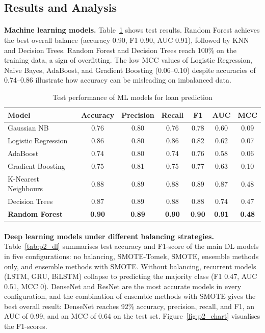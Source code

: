 \documentclass[12pt,a4paper,final]{extreport}
\begin{document}
\subsection{Results and Analysis}

\paragraph{} \textbf{Machine learning models.} Table~\ref{tab:p2_ml} shows test results. Random Forest achieves the best overall balance (accuracy 0.90, F1 0.90, AUC 0.91), followed by KNN and Decision Trees. Random Forest and Decision Trees reach 100\% on the training data, a sign of overfitting. The low MCC values of Logistic Regression, Naive Bayes, AdaBoost, and Gradient Boosting (0.06--0.10) despite accuracies of 0.74--0.86 illustrate how accuracy can be misleading on imbalanced data.

{\renewcommand{\arraystretch}{1.2}
\begin{table}[htbp]
\centering
\caption{Test performance of ML models for loan prediction \cite{p2}}\label{tab:p2_ml}
\small
\begin{tabular}{|l|c|c|c|c|c|c|}
\hline
\textbf{Model} & \textbf{Accuracy} & \textbf{Precision} & \textbf{Recall} & \textbf{F1} & \textbf{AUC} & \textbf{MCC} \\ \hline
Gaussian NB & 0.76 & 0.80 & 0.76 & 0.78 & 0.60 & 0.09 \\ \hline
Logistic Regression & 0.86 & 0.80 & 0.86 & 0.82 & 0.62 & 0.07 \\ \hline
AdaBoost & 0.74 & 0.80 & 0.74 & 0.76 & 0.58 & 0.06 \\ \hline
Gradient Boosting & 0.75 & 0.81 & 0.75 & 0.77 & 0.63 & 0.10 \\ \hline
K-Nearest Neighbours & 0.88 & 0.89 & 0.88 & 0.89 & 0.87 & 0.48 \\ \hline
Decision Trees & 0.87 & 0.89 & 0.88 & 0.88 & 0.74 & 0.47 \\ \hline
\textbf{Random Forest} & \textbf{0.90} & \textbf{0.89} & \textbf{0.90} & \textbf{0.90} & \textbf{0.91} & \textbf{0.48} \\ \hline
\end{tabular}
\end{table}}

\paragraph{} \textbf{Deep learning models under different balancing strategies.} Table~\ref{tab:p2_dl} summarises test accuracy and F1-score of the main DL models in five configurations: no balancing, SMOTE-Tomek, SMOTE, ensemble methods only, and ensemble methods with SMOTE. Without balancing, recurrent models (LSTM, GRU, BiLSTM) collapse to predicting the majority class (F1 0.47, AUC 0.51, MCC 0). DenseNet and ResNet are the most accurate models in every configuration, and the combination of ensemble methods with SMOTE gives the best overall result: DenseNet reaches 92\% accuracy, precision, recall, and F1, an AUC of 0.99, and an MCC of 0.64 on the test set. Figure~\ref{fig:p2_chart} visualises the F1-scores.
\end{document}
